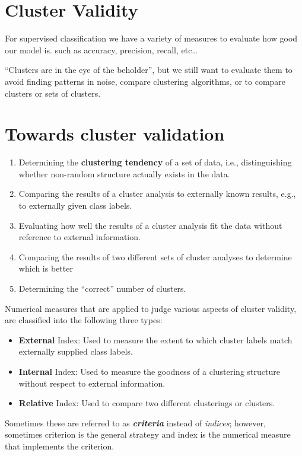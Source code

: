 \section{Cluster Validity}
For supervised classification we have a variety of measures to evaluate how good our model is. such as accuracy, precision, recall, etc\dots



``Clusters are in the eye of the beholder'', but we still want to evaluate them to avoid finding patterns in noise, compare clustering algorithms, or to compare clusters or sets of clusters.

\section{Towards cluster validation}

\begin{enumerate}
   \item 
   Determining the \textbf{clustering tendency} of a set of data, i.e., distinguishing whether non-random structure actually exists in the data.
   \item Comparing the results of a cluster analysis to externally known results, e.g., to externally given class labels.
   \item Evaluating how well the results of a cluster analysis fit the data without reference to external information.
   \item Comparing the results of two different sets of cluster analyses to determine which is better
   \item Determining the ``correct'' number of clusters.
\end{enumerate}

Numerical measures that are applied to judge various aspects of cluster validity, are classified into the following three types:
\begin{itemize}
   \item \textbf{External} Index: Used to measure the extent to which cluster labels
match externally supplied class labels.
\item \textbf{Internal} Index: Used to measure the goodness of a clustering
structure without respect to external information.
\item \textbf{Relative} Index: Used to compare two different clusterings or
clusters.
\end{itemize}
Sometimes these are referred to as \textit{\textbf{criteria}} instead of \textit{indices}; however, sometimes criterion is the general strategy and index is the numerical measure that implements the criterion.

